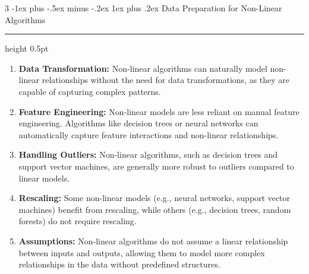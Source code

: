 \documentclass[letterpaper, 10.5pt,landscape]{article}
\makeatletter
\renewcommand{\subsubsection}{\@startsection{subsubsection}{3}{0mm}%
                                {-1ex plus -.5ex minus -.2ex}%
                                {1ex plus .2ex}%
                                {\normalfont\small\bfseries}}
\makeatother
\begin{document}
\begin{multicols*}{3}
\subsubsection{Data Preparation for Non-Linear Algorithms} {\color{teal}\hrule height 0.5pt} \smallskip

\begin{enumerate}
    \item \textbf{Data Transformation:} 
    Non-linear algorithms can naturally model non-linear relationships without the need for data transformations, as they are capable of capturing complex patterns.
    \vspace{-2pt}
    \item \textbf{Feature Engineering:} 
    Non-linear models are less reliant on manual feature engineering. Algorithms like decision trees or neural networks can automatically capture feature interactions and non-linear relationships.
    \vspace{-2pt}
    \item \textbf{Handling Outliers:} 
    Non-linear algorithms, such as decision trees and support vector machines, are generally more robust to outliers compared to linear models.
    \vspace{-2pt}
    \item \textbf{Rescaling:} 
    Some non-linear models (e.g., neural networks, support vector machines) benefit from rescaling, while others (e.g., decision trees, random forests) do not require rescaling.
    \vspace{-2pt}
    \item \textbf{Assumptions:} 
    Non-linear algorithms do not assume a linear relationship between inputs and outputs, allowing them to model more complex relationships in the data without predefined structures.
\end{enumerate}




\end{multicols*}
\end{document}
